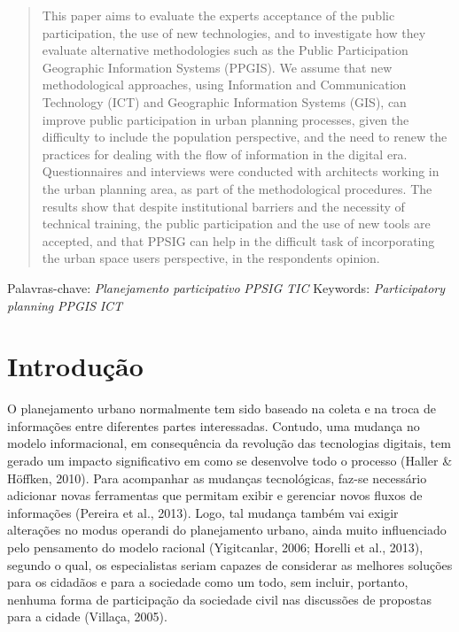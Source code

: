 \documentclass{article}
\begin{document}
\renewcommand{\abstractname}{Abstract}
\begin{abstract}

This paper aims to evaluate the experts acceptance of the public participation,
the use of new technologies, and to investigate how they evaluate alternative
methodologies such as the Public Participation Geographic Information Systems
(PPGIS). We assume that new methodological approaches, using Information and
Communication Technology (ICT) and Geographic Information Systems (GIS), can
improve public participation in urban planning processes, given the difficulty
to include the population perspective, and the need to renew the practices for
dealing with the flow of information in the digital era. Questionnaires and
interviews were conducted with architects working in the urban planning area, as
part of the methodological procedures. The results show that despite
institutional barriers and the necessity of technical training, the public
participation and the use of new tools are accepted, and that PPSIG can help in
the difficult task of incorporating the urban space users perspective, in the
respondents opinion.

\end{abstract}
Palavras-chave: \textit{Planejamento participativo}
\textit{PPSIG}
\textit{TIC}
Keywords: \textit{Participatory planning}
\textit{PPGIS}
\textit{ICT}
\section{Introdução}

O planejamento urbano normalmente tem sido baseado na coleta e na troca de
informações entre diferentes partes interessadas. Contudo, uma mudança no modelo
informacional, em consequência da revolução das tecnologias digitais, tem gerado
um
impacto significativo em como se desenvolve todo o processo (Haller \& Höffken,
2010). Para acompanhar as mudanças
tecnológicas, faz-se necessário adicionar novas ferramentas que permitam exibir
e
gerenciar novos fluxos de informações (Pereira et
al., 2013). Logo, tal mudança também vai exigir alterações no
modus operandi do planejamento urbano, ainda muito influenciado
pelo pensamento do modelo racional (Yigitcanlar,
2006; Horelli et al., 2013),
segundo o qual, os especialistas seriam capazes de considerar as melhores
soluções
para os cidadãos e para a sociedade como um todo, sem incluir, portanto, nenhuma
forma de participação da sociedade civil nas discussões de propostas para a
cidade
(Villaça, 2005).
\end{document}
